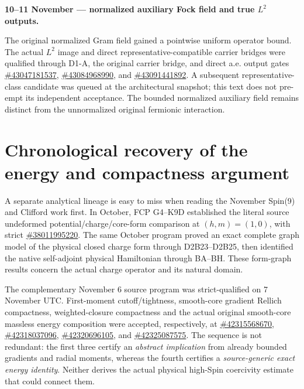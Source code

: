 \par\medskip\noindent\textbf{10--11 November --- normalized auxiliary Fock field and true $L^2$ outputs.}\par\smallskip
The original normalized Gram field gained a pointwise uniform operator
bound. The actual $L^2$ image and direct representative-compatible
carrier bridges were qualified through D1-A, the original carrier
bridge, and direct a.e. output gates
\href{https://github.com/etblink/math/actions/runs/43047181537}{\#43047181537},
\href{https://github.com/etblink/math/actions/runs/43084968990}{\#43084968990}, and
\href{https://github.com/etblink/math/actions/runs/43091441892}{\#43091441892}.
A subsequent representative-class candidate was queued at the
architectural snapshot; this text does not pre-empt its independent
acceptance. The bounded normalized auxiliary field remains distinct
from the unnormalized original fermionic interaction.


\section{Chronological recovery of the energy and compactness argument}
A separate analytical lineage is easy to miss when reading the November
Spin(9) and Clifford work first. In October, FCP G4--K9D established the
literal source undeformed potential/charge/core-form comparison at
$(h,m)=(1,0)$, with strict
\href{https://github.com/etblink/Foundational-Convergence-Program/actions/runs/38011995220}{\#38011995220}.
The same October program proved an exact complete graph model of the
physical closed charge form through D2B23--D2B25, then identified the
native self-adjoint physical Hamiltonian through BA--BH. These form-graph
results concern the actual charge operator and its natural domain.

The complementary November 6 source program was strict-qualified on
7 November UTC. First-moment cutoff/tightness, smooth-core gradient
Rellich compactness, weighted-closure compactness and the actual original
smooth-core massless energy composition were accepted, respectively, at
\href{https://github.com/etblink/math/actions/runs/42315568670}{\#42315568670},
\href{https://github.com/etblink/math/actions/runs/42318037096}{\#42318037096},
\href{https://github.com/etblink/math/actions/runs/42320696105}{\#42320696105}, and
\href{https://github.com/etblink/math/actions/runs/42325087575}{\#42325087575}.
The sequence is not redundant: the first three certify an
\emph{abstract implication} from already bounded gradients and radial
moments, whereas the fourth certifies a \emph{source-generic exact energy
identity}. Neither derives the actual physical high-Spin coercivity
estimate that could connect them.

